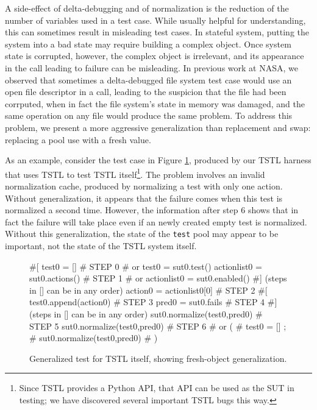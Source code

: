 A side-effect of delta-debugging and of normalization is the reduction
of the number of variables used in a test case.  While usually helpful
for understanding, this can sometimes result in misleading test
cases.  In stateful system, putting the system into a bad state may require
building a complex object.  Once system state is corrupted, however,
the complex object is irrelevant, and its appearance in the call
leading to failure can be misleading.  In previous work at NASA, we
observed that sometimes a delta-debugged file system test case
\cite{ICSEDiff,AMAI} would use an open file descriptor in a call,
leading to the suspicion that the file had been corrputed, when in
fact the file system's state in memory was damaged, and the same
operation on any file would produce the same problem.  To address this
problem, we present a more aggressive generalization than
replacement and swap:  replacing a pool use with a
fresh value.  

As an example, consider the test case in Figure \ref{fig:mislead},
produced by our TSTL harness that uses TSTL to test TSTL
itself\footnote{Since TSTL provides a Python API, that API can be used
  as the SUT in testing; we have discovered several important TSTL
  bugs this way.}.  The problem involves an invalid normalization
cache, produced by normalizing a test with only one action.  Without
generalization, it appears that the failure comes when this test is
normalized a second time.  However, the information after step 6 shows
that in fact the failure will take place even if an newly created empty test is
normalized.  Without this generalization, the state of the {\tt test} pool
may appear to be important, not the state of the TSTL system itself.

\begin{figure}
{\scriptsize
\begin{code}
\textcolor{black!45}{\#[}
test0 = []                             \textcolor{black!45}{\# STEP 0}
\textcolor{black!45}{\#  or test0 = sut0.test() }
actionlist0 = sut0.actions()           \textcolor{black!45}{\# STEP 1}
\textcolor{black!45}{\#  or actionlist0 = sut0.enabled() }
\textcolor{black!45}{\#] (steps in [] can be in any order)}
action0 = actionlist0[0]               \textcolor{black!45}{\# STEP 2}
\textcolor{black!45}{\#[}
test0.append(action0)                  \textcolor{black!45}{\# STEP 3}
pred0 = sut0.fails                     \textcolor{black!45}{\# STEP 4}
\textcolor{black!45}{\#] (steps in [] can be in any order)}
sut0.normalize(test0,pred0)            \textcolor{black!45}{\# STEP 5}
sut0.normalize(test0,pred0)            \textcolor{black!45}{\# STEP 6}
\textcolor{black!45}{\#  or (}
\textcolor{black!45}{\#      test0 = []  ;}
\textcolor{black!45}{\#      sut0.normalize(test0,pred0) }
\textcolor{black!45}{\#     )}
\end{code}
}
\caption{Generalized test for TSTL itself, showing fresh-object
  generalization.}
\label{fig:mislead}
\end{figure}

